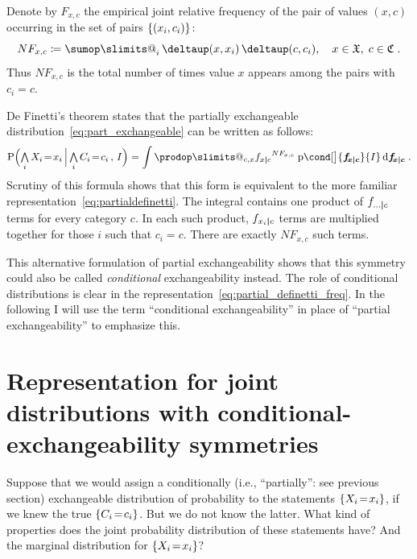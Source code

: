 \documentclass[\ifafour a4paper,12pt,\else a5paper,10pt,\fi%
onecolumn,oneside,article,%
british%
]{memoir}
\makeatletter
\theoremstyle{remark}
\theoremstyle{innote}
\def\sum{\DOTSI\sumop\slimits@}
\def\prod{\DOTSI\prodop\slimits@}
\newcommand*{\delt}{\deltaup}%
\newcommand*{\di}{\mathrm{d}}%
\newcommand*{\defd}{\coloneqq}
\newcommand*{\Land}{\mathop{\textstyle\bigwedge}}
\DeclarePairedDelimiter\set{\{}{\}}
\newcommand*{\pf}{\mathrm{p}}%
\newcommand*{\p}{\mathrm{P}}%
\renewcommand*{\|}[1][]{\nonscript\,#1\vert\nonscript\,\mathopen{}}
\newcommand*{\ie}{{i.e.}}
\newcommand*{\tsum}{\mathop{\textstyle\sum}\nolimits}
\renewcommand*{\=}{\TextOrMath\texteq\eq}
\newcommand*{\X}[1]{X_{#1}}
\newcommand*{\x}[1]{x_{#1}}
\newcommand*{\C}[1]{C_{#1}}
\newcommand*{\cc}[1]{c_{#1}}
\newcommand*{\sx}{\mathfrak{X}}
\newcommand*{\sC}{\mathfrak{C}}
\newcommand*{\fxc}{\bm{f_{\!x\bcond c}}}
\newcommand*{\bcond}[1][]{\nonscript\,#1\bm{\vert}\nonscript\;\mathopen{}}
\makeatother
\begin{document}
Denote by $F_{x,c}$ the empirical joint relative frequency of the pair of
values $(x,c)$ occurring in the set of pairs $\set{(\x{i}, \cc{i})}$:
\begin{equation}
  \label{eq:rel_frequencies}
  N F_{x,c} \defd \tsum_{i}\delt(x, \x{i})\,\delt(c, \cc{i}),
  \quad x \in \sx,\; c \in \sC \;.
\end{equation}
Thus $N F_{x,c}$ is the total number of times value $x$ appears among the
pairs with $\cc{i}=c$.

De Finetti’s theorem states that the partially exchangeable
distribution~\eqref{eq:part_exchangeable} can be written as follows:
\begin{equation}
  \label{eq:partial_definetti_freq}
    \p\Bigl(\Land_{i} \X{i}\=\x{i} \|[\Big]
    \Land_{i}\C{i}\=\cc{i}\,,\,  I\Bigr) =
\int\prod_{c,x} {f_{x \bcond c}}^{N F_{x, c}}\;
\pf\cond[\big]{\fxc}{I} \,\di\fxc \;.
\end{equation}
Scrutiny of this formula shows that this form is equivalent to the more
familiar representation~\eqref{eq:partialdefinetti}. The integral contains
one product of $f_{\dotso \bcond c}$ terms for every category $c$. In each
such product, $f_{\x{i} \bcond c}$ terms are multiplied together for those
$i$ such that $\cc{i}=c$. There are exactly $N F_{x,c}$ such terms.

This alternative formulation of partial exchangeability shows that this
symmetry could also be called \emph{conditional} exchangeability instead.
The role of conditional distributions is clear in the
representation~\eqref{eq:partial_definetti_freq}. In the following I will
use the term \enquote{conditional exchangeability} in place of
\enquote{partial exchangeability} to emphasize this.







\section{Representation for joint distributions with
  conditional-exchangeability symmetries}
\label{sec:result}

Suppose that we would assign a conditionally (\ie, \enquote{partially}: see
previous section) exchangeable distribution of probability to the
statements $\set{\X{i}\=\x{i}}$, if we knew the true $\set{\C{i}\=\cc{i}}$.
But we do not know the latter. What kind of properties does the joint
probability distribution of these statements have? And the marginal
distribution for $\set{\X{i}\=\x{i}}$?
\end{document}
